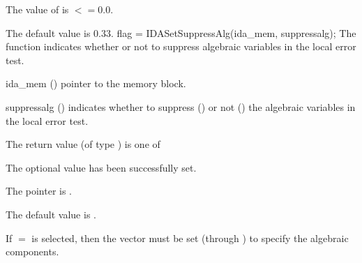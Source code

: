 {{\begin{args}
    The value of  is $<= 0.0$.
  \end{args}
}
{
  The default value is $0.33$.
}
{
flag = IDASetSuppressAlg(ida\_mem, suppressalg);
}
{
  The function  indicates whether or not to
  suppress algebraic variables in the local error test.
}
{
  \begin{args}[suppressalg]
  \item[ida\_mem] ()
    pointer to the {\ida} memory block.
  \item[suppressalg] ()
    indicates whether to suppress () or not
    () the algebraic variables in the local error test.
  \end{args}
}
{
  The return value  (of type ) is one of
  \begin{args}
  \item[\Id{IDA\_SUCCESS}] 
    The optional value has been successfully set.
  \item[\Id{IDA\_MEM\_NULL}]
    The  pointer is .
  \end{args}
}
{
  The default value is .

  If $=$ is selected, then the  vector
  must be set (through ) to specify the algebraic components.

}}
